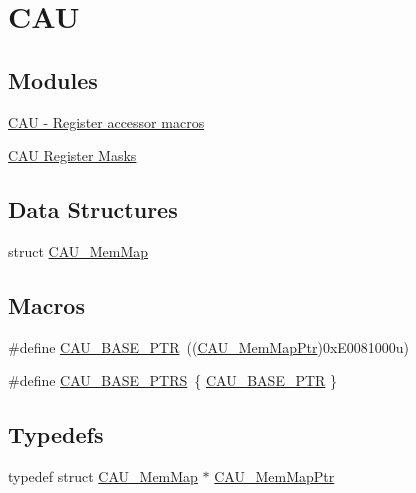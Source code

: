 \hypertarget{group___c_a_u___peripheral}{}\section{C\+A\+U}
\label{group___c_a_u___peripheral}
\subsection*{Modules}
\begin{DoxyCompactItemize}
\item 
\hyperlink{group___c_a_u___register___accessor___macros}{C\+A\+U -\/ Register accessor macros}
\item 
\hyperlink{group___c_a_u___register___masks}{C\+A\+U Register Masks}
\end{DoxyCompactItemize}
\subsection*{Data Structures}
\begin{DoxyCompactItemize}
\item 
struct \hyperlink{struct_c_a_u___mem_map}{C\+A\+U\+\_\+\+Mem\+Map}
\end{DoxyCompactItemize}
\subsection*{Macros}
\begin{DoxyCompactItemize}
\item 
\#define \hyperlink{group___c_a_u___peripheral_gaf2a80b84a866e513ee484bbb861fa36d}{C\+A\+U\+\_\+\+B\+A\+S\+E\+\_\+\+P\+T\+R}~((\hyperlink{group___c_a_u___peripheral_ga207de3afa3c0fec8cef914aa8027fc35}{C\+A\+U\+\_\+\+Mem\+Map\+Ptr})0x\+E0081000u)
\item 
\#define \hyperlink{group___c_a_u___peripheral_gaadc82a2eed7dcf40fa9a17abe0f2ff6e}{C\+A\+U\+\_\+\+B\+A\+S\+E\+\_\+\+P\+T\+R\+S}~\{ \hyperlink{group___c_a_u___peripheral_gaf2a80b84a866e513ee484bbb861fa36d}{C\+A\+U\+\_\+\+B\+A\+S\+E\+\_\+\+P\+T\+R} \}
\end{DoxyCompactItemize}
\subsection*{Typedefs}
\begin{DoxyCompactItemize}
\item 
typedef struct \hyperlink{struct_c_a_u___mem_map}{C\+A\+U\+\_\+\+Mem\+Map} $\ast$ \hyperlink{group___c_a_u___peripheral_ga207de3afa3c0fec8cef914aa8027fc35}{C\+A\+U\+\_\+\+Mem\+Map\+Ptr}
\end{DoxyCompactItemize}


